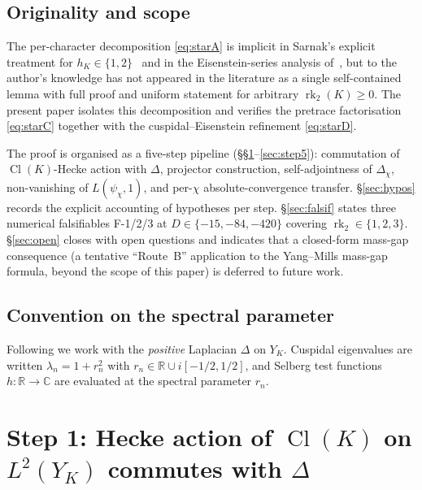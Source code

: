 \documentclass[11pt,a4paper,reqno]{amsart}
\theoremstyle{definition}
\DeclareMathOperator{\Cl}{Cl}
\DeclareMathOperator{\rk}{rk}
\newcommand{\RR}{\mathbb{R}}
\newcommand{\CC}{\mathbb{C}}
\newcommand{\YK}{Y_K}
\begin{document}
\subsection{Originality and scope}\label{ss:originality}

The per-character decomposition \eqref{eq:starA} is implicit in Sarnak's explicit treatment for $h_K\in\{1,2\}$~\cite[\S\S3--4]{Sarnak1983} and in the Eisenstein-series analysis of~\cite[\S7.7]{ElstrodtGrunewaldMennicke1998}, but to the author's knowledge has not appeared in the literature as a single self-contained lemma with full proof and uniform statement for arbitrary $\rk_2(K)\geq 0$. The present paper isolates this decomposition and verifies the pretrace factorisation \eqref{eq:starC} together with the cuspidal--Eisenstein refinement \eqref{eq:starD}.

The proof is organised as a five-step pipeline (\S\S\ref{sec:step1}--\ref{sec:step5}): commutation of $\Cl(K)$-Hecke action with $\Delta$, projector construction, self-adjointness of $\Delta_\chi$, non-vanishing of $L(\psi_\chi,1)$, and per-$\chi$ absolute-convergence transfer. \S\ref{sec:hypos} records the explicit accounting of hypotheses per step. \S\ref{sec:falsif} states three numerical falsifiables F-1/2/3 at $D\in\{-15,-84,-420\}$ covering $\rk_2\in\{1,2,3\}$. \S\ref{sec:open} closes with open questions and indicates that a closed-form mass-gap consequence (a tentative ``Route~B'' application to the Yang--Mills mass-gap formula, beyond the scope of this paper) is deferred to future work.

\subsection{Convention on the spectral parameter}\label{ss:convention}

Following \cite[\S\S3--4]{ElstrodtGrunewaldMennicke1998} we work with the \emph{positive} Laplacian $\Delta$ on $\YK$. Cuspidal eigenvalues are written $\lambda_n = 1+r_n^2$ with $r_n\in\RR\cup i[-1/2,1/2]$, and Selberg test functions $h:\RR\to\CC$ are evaluated at the spectral parameter $r_n$.

\section{Step 1: Hecke action of $\Cl(K)$ on $L^2(\YK)$ commutes with $\Delta$}\label{sec:step1}
\end{document}
